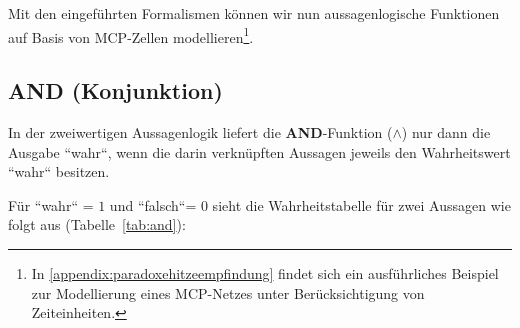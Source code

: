 Mit den eingeführten Formalismen können wir nun aussagenlogische Funktionen auf Basis von MCP-Zellen modellieren\footnote{
In \ref{appendix:paradoxehitzeempfindung} findet sich ein ausführliches Beispiel zur Modellierung eines MCP-Netzes unter Berücksichtigung von Zeiteinheiten.
}.


\subsection*{AND (Konjunktion)}
In der zweiwertigen Aussagenlogik liefert die \textbf{AND}-Funktion ($\land$) nur dann die Ausgabe ``wahr``, wenn die darin verknüpften Aussagen jeweils den Wahrheitswert ``wahr`` besitzen.

Für ``wahr`` = $1$ und ``falsch``= $0$ sieht die Wahrheitstabelle für zwei Aussagen wie folgt aus (Tabelle~\ref{tab:and}):

